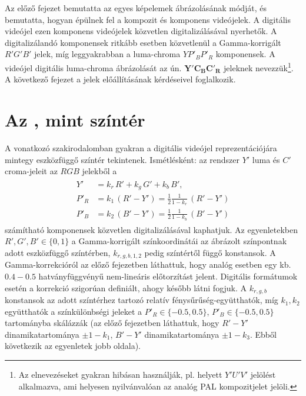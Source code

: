Az előző fejezet bemutatta az egyes képelemek ábrázolásának módját, és bemutatta, hogyan épülnek fel a kompozit és komponens videójelek.
A digitális videójel ezen komponens videójelek közvetlen digitalizálásával nyerhetők.
A digitalizálandó komponensek ritkább esetben közvetlenül a Gamma-korrigált $R'G'B'$ jelek, míg leggyakrabban a luma-chroma $YP'_BP'_R$ komponensek.
A videójel digitális luma-chroma ábrázolását az ún. $\mathbf{Y'C_{B}C'_{R}}$ jeleknek nevezzük\footnote{Az elnevezéseket gyakran hibásan használják, pl. \ycbcr helyett $Y'U'V'$ jelölést alkalmazva, ami helyesen nyilvánvalóan az analóg PAL kompozitjelet jelöli.}.
A következő fejezet a \ycbcr jelek előállításának kérdéseivel foglalkozik.

\section{Az \ycbcr, mint színtér}

A vonatkozó szakirodalomban gyakran a digitális videójel \ycbcr reprezentációjára mintegy eszközfüggő színtér tekintenek.
Ismétlésként: az \ycbcr rendszer $Y'$ luma és $C'$ croma-jeleit az $RGB$ jelekből a 
\begin{align}
\begin{split}
Y' &= k_r \, R' + k_g \, G' + k_b \, B' ,\\
P'_R &= k_1 \, \left( R' - Y' \right) = \frac{1}{2} \frac{1}{1 - k_r} \, \left( R' - Y' \right)\\
P'_B &=  k_2 \, \left( B' - Y' \right) = \frac{1}{2} \frac{1}{1 - k_b} \, \left( B' - Y' \right)
\end{split}
\end{align}
számítható \ypbpr komponensek közvetlen digitalizálásával kaphatjuk.
Az egyenletekben $R', G', B'  \in \lbrace 0, 1 \rbrace$ a Gamma-korrigált színkoordinátái az ábrázolt színpontnak adott eszközfüggő színtérben, $k_{r,g,b,1,2}$ pedig színtértől függő konstansok.
A Gamma-korrekcióról az előző fejezetben láthattuk, hogy analóg esetben egy kb. $0.4-0.5$ hatványfüggvényű nem-lineáris előtorzítást jelent.
Digitális formátumok esetén a korrekció szigorúan definiált, ahogy később látni fogjuk.
A $k_{r,g,b}$ konstansok az adott színtérhez tartozó relatív fénysűrűség-együtthatók, míg $k_1, k_2$ együtthatók a színkülönbségi jeleket a $P'_R \in \lbrace-0.5, 0.5\rbrace$, $P'_B \in \lbrace-0.5, 0.5\rbrace$ tartományba skálázzák (az előző fejezetben láthattuk, hogy $R'-Y'$ dinamikatartománya $\pm 1 - k_1$, $B'-Y'$ dinamikatartománya $\pm 1 - k_3$.
Ebből következik az egyenletek jobb oldala).

